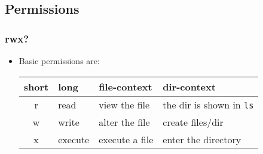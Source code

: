 \documentclass[handout]{beamer}
\newcommand{\code}[1]{\colorbox{lGray}{\texttt{#1}}}
\begin{document}
    \subsection{Permissions}
        \begin{frame}
			\frametitle{rwx?}
			\begin{itemize}
                \item<1-> Basic permissions are: \\
                \begin{tabular}{clll}
                    short & long & file-context & dir-context \\ \hline
                    r & read & view the file & the dir is shown in \code{ls} \\
                    w & write & alter the file & create files/dir \\
                    x & execute & execute a file & enter the directory
                \end{tabular}
            \end{itemize}
		\end{frame}
\end{document}
